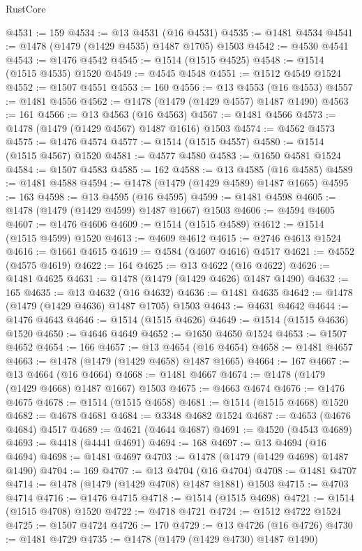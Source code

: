 \begin{lexlean}{RustCore}
\begin{coremodule}
@4531 := 159
@4534 := @13 @4531 (@16 @4531)
@4535 := @1481 @4534
@4541 := @1478 (@1479 (@1429 @4535) @1487 @1705) @1503
@4542 := @4530 @4541
@4543 := @1476 @4542
@4545 := @1514 (@1515 @4525)
@4548 := @1514 (@1515 @4535) @1520
@4549 := @4545 @4548
@4551 := @1512 @4549 @1524
@4552 := @1507 @4551
@4553 := 160
@4556 := @13 @4553 (@16 @4553)
@4557 := @1481 @4556
@4562 := @1478 (@1479 (@1429 @4557) @1487 @1490)
@4563 := 161
@4566 := @13 @4563 (@16 @4563)
@4567 := @1481 @4566
@4573 := @1478 (@1479 (@1429 @4567) @1487 @1616) @1503
@4574 := @4562 @4573
@4575 := @1476 @4574
@4577 := @1514 (@1515 @4557)
@4580 := @1514 (@1515 @4567) @1520
@4581 := @4577 @4580
@4583 := @1650 @4581 @1524
@4584 := @1507 @4583
@4585 := 162
@4588 := @13 @4585 (@16 @4585)
@4589 := @1481 @4588
@4594 := @1478 (@1479 (@1429 @4589) @1487 @1665)
@4595 := 163
@4598 := @13 @4595 (@16 @4595)
@4599 := @1481 @4598
@4605 := @1478 (@1479 (@1429 @4599) @1487 @1667) @1503
@4606 := @4594 @4605
@4607 := @1476 @4606
@4609 := @1514 (@1515 @4589)
@4612 := @1514 (@1515 @4599) @1520
@4613 := @4609 @4612
@4615 := @2746 @4613 @1524
@4616 := @1661 @4615
@4619 := @4584 (@4607 @4616) @4517
@4621 := @4552 (@4575 @4619)
@4622 := 164
@4625 := @13 @4622 (@16 @4622)
@4626 := @1481 @4625
@4631 := @1478 (@1479 (@1429 @4626) @1487 @1490)
@4632 := 165
@4635 := @13 @4632 (@16 @4632)
@4636 := @1481 @4635
@4642 := @1478 (@1479 (@1429 @4636) @1487 @1705) @1503
@4643 := @4631 @4642
@4644 := @1476 @4643
@4646 := @1514 (@1515 @4626)
@4649 := @1514 (@1515 @4636) @1520
@4650 := @4646 @4649
@4652 := @1650 @4650 @1524
@4653 := @1507 @4652
@4654 := 166
@4657 := @13 @4654 (@16 @4654)
@4658 := @1481 @4657
@4663 := @1478 (@1479 (@1429 @4658) @1487 @1665)
@4664 := 167
@4667 := @13 @4664 (@16 @4664)
@4668 := @1481 @4667
@4674 := @1478 (@1479 (@1429 @4668) @1487 @1667) @1503
@4675 := @4663 @4674
@4676 := @1476 @4675
@4678 := @1514 (@1515 @4658)
@4681 := @1514 (@1515 @4668) @1520
@4682 := @4678 @4681
@4684 := @3348 @4682 @1524
@4687 := @4653 (@4676 @4684) @4517
@4689 := @4621 (@4644 @4687)
@4691 := @4520 (@4543 @4689)
@4693 := @4418 (@4441 @4691)
@4694 := 168
@4697 := @13 @4694 (@16 @4694)
@4698 := @1481 @4697
@4703 := @1478 (@1479 (@1429 @4698) @1487 @1490)
@4704 := 169
@4707 := @13 @4704 (@16 @4704)
@4708 := @1481 @4707
@4714 := @1478 (@1479 (@1429 @4708) @1487 @1881) @1503
@4715 := @4703 @4714
@4716 := @1476 @4715
@4718 := @1514 (@1515 @4698)
@4721 := @1514 (@1515 @4708) @1520
@4722 := @4718 @4721
@4724 := @1512 @4722 @1524
@4725 := @1507 @4724
@4726 := 170
@4729 := @13 @4726 (@16 @4726)
@4730 := @1481 @4729
@4735 := @1478 (@1479 (@1429 @4730) @1487 @1490)

\end{coremodule}
\end{lexlean}
